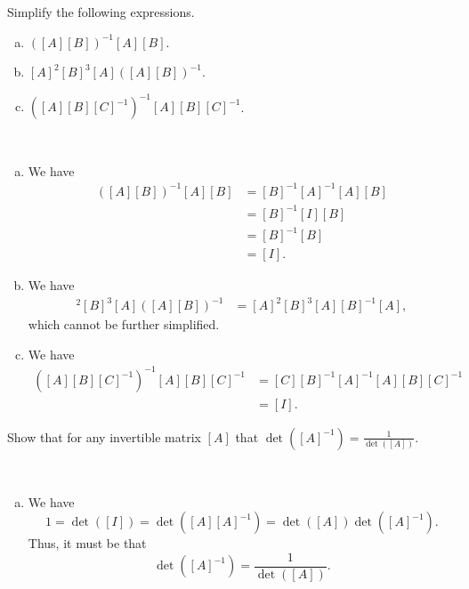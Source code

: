 \documentclass[12pt]{article} %
\begin{document}
\newpage
\begin{problem}
Simplify the following expressions.
\begin{enumerate}[(a)]
    \item $([A][B])^{-1} [A] [B]$.
    \item $[A]^2[B]^3[A] ([A][B])^{-1}$.
    \item $([A][B][C]^{-1})^{-1} [A][B] [C]^{-1}$.
\end{enumerate}
\end{problem}
\begin{solution}~
\begin{enumerate}[(a)]
    \item We have
    \begin{align*}
        ([A][B])^{-1} [A][B] &= [B]^{-1} [A]^{-1} [A][B]\\
        &= [B]^{-1} [I] [B]\\
        &= [B]^{-1} [B]\\
        &= [I].
    \end{align*}
    \item We have
    \begin{align*}
        [A]^2[B]^3[A] ([A][B])^{-1} &= [A]^2 [B]^3 [A] [B]^{-1} [A],
    \end{align*}
    which cannot be further simplified.
    \item We have
    \begin{align*}
        ([A][B][C]^{-1})^{-1} [A][B][C]^{-1} &= [C][B]^{-1}[A]^{-1} [A][B][C]^{-1}\\
        &= [I].
    \end{align*}
\end{enumerate}
\end{solution}

\newpage
\begin{problem}
Show that for any invertible matrix $[A]$ that $\det([A]^{-1})=\frac{1}{\det([A])}$.
\end{problem}
\begin{solution}~
\begin{enumerate}[(a)]
    \item We have
    \[
    1=\det([I]) = \det([A][A]^{-1}) = \det([A])\det([A]^{-1}).
    \]
    Thus, it must be that
    \[
    \det([A]^{-1}) = \frac{1}{\det([A])}.
    \]
\end{enumerate}
\end{solution}
\end{document}
